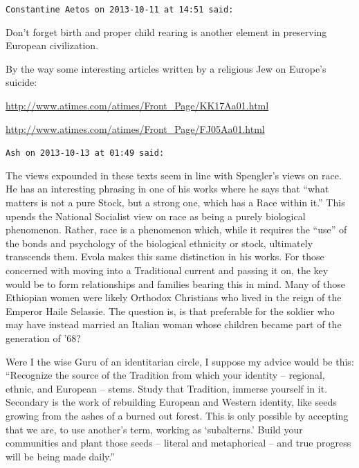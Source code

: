 \begin{footnotesize}
\begin{sffamily}
\hfill

\texttt{Constantine Aetos on 2013-10-11 at 14:51 said:}

Don't forget birth and proper child rearing is another element in preserving European civilization.

By the way some interesting articles written by a religious Jew on Europe's suicide:

\url{http://www.atimes.com/atimes/Front_Page/KK17Aa01.html}


\url{http://www.atimes.com/atimes/Front_Page/FJ05Aa01.html}


\hfill

\texttt{Ash on 2013-10-13 at 01:49 said:}

The views expounded in these texts seem in line with Spengler's views on race. He has an interesting phrasing in one of his works where he says that ``what matters is not a pure Stock, but a strong one, which has a Race within it.'' This upends the National Socialist view on race as being a purely biological phenomenon. Rather, race is a phenomenon which, while it requires the ``use'' of the bonds and psychology of the biological ethnicity or stock, ultimately transcends them. Evola makes this same distinction in his works. For those concerned with moving into a Traditional current and passing it on, the key would be to form relationships and families bearing this in mind. Many of those Ethiopian women were likely Orthodox Christians who lived in the reign of the Emperor Haile Selassie. The question is, is that preferable for the soldier who may have instead married an Italian woman whose children became part of the generation of '68?

Were I the wise Guru of an identitarian circle, I suppose my advice would be this: ``Recognize the source of the Tradition from which your identity -- regional, ethnic, and European -- stems. Study that Tradition, immerse yourself in it. Secondary is the work of rebuilding European and Western identity, like seeds growing from the ashes of a burned out forest. This is only possible by accepting that we are, to use another's term, working as `subalterns.' Build your communities and plant those seeds -- literal and metaphorical -- and true progress will be being made daily.''

\end{sffamily}
\end{footnotesize}

